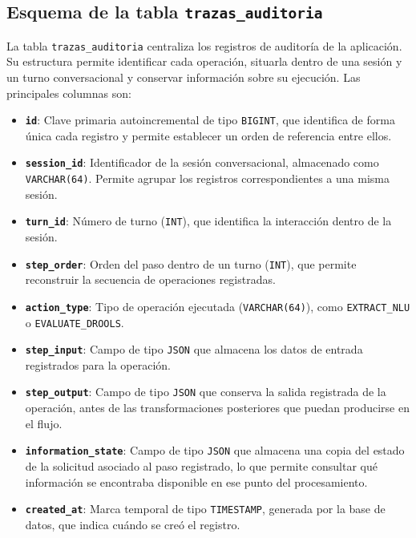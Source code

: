 \documentclass[12pt,a4paper]{report}
\begin{document}
\subsection{Esquema de la tabla \texttt{trazas\_auditoria}}

La tabla \texttt{trazas\_auditoria} centraliza los registros de auditoría de la aplicación. Su estructura permite identificar cada operación, situarla dentro de una sesión y un turno conversacional y conservar información sobre su ejecución. Las principales columnas son:

\begin{itemize}
    \item \textbf{\texttt{id}}: Clave primaria autoincremental de tipo \texttt{BIGINT}, que identifica de forma única cada registro y permite establecer un orden de referencia entre ellos.
    \item \textbf{\texttt{session\_id}}: Identificador de la sesión conversacional, almacenado como \texttt{VARCHAR(64)}. Permite agrupar los registros correspondientes a una misma sesión.
    \item \textbf{\texttt{turn\_id}}: Número de turno (\texttt{INT}), que identifica la interacción dentro de la sesión.
    \item \textbf{\texttt{step\_order}}: Orden del paso dentro de un turno (\texttt{INT}), que permite reconstruir la secuencia de operaciones registradas.
    \item \textbf{\texttt{action\_type}}: Tipo de operación ejecutada (\texttt{VARCHAR(64)}), como \texttt{EXTRACT\_NLU} o \texttt{EVALUATE\_DROOLS}.
    \item \textbf{\texttt{step\_input}}: Campo de tipo \texttt{JSON} que almacena los datos de entrada registrados para la operación.
    \item \textbf{\texttt{step\_output}}: Campo de tipo \texttt{JSON} que conserva la salida registrada de la operación, antes de las transformaciones posteriores que puedan producirse en el flujo.
    \item \textbf{\texttt{information\_state}}: Campo de tipo \texttt{JSON} que almacena una copia del estado de la solicitud asociado al paso registrado, lo que permite consultar qué información se encontraba disponible en ese punto del procesamiento.
    \item \textbf{\texttt{created\_at}}: Marca temporal de tipo \texttt{TIMESTAMP}, generada por la base de datos, que indica cuándo se creó el registro.
\end{itemize}
\end{document}
